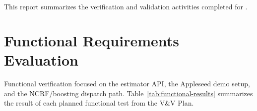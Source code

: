 \documentclass[12pt, titlepage]{article}
\begin{document}
\newpage

\tableofcontents

\listoftables


\newpage


This report summarizes the verification and validation activities completed for \progname{}.

\section{Functional Requirements Evaluation}

Functional verification focused on the estimator API, the Appleseed demo setup, and the NCRF/boosting dispatch path. Table~\ref{tab:functional-results} summarizes the result of each planned functional test from the V\&V Plan.
\end{document}
